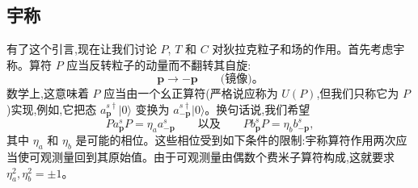 \subsection{宇称}

有了这个引言,现在让我们讨论 $P$, $T$ 和 $C$ 对狄拉克粒子和场的作用。首先考虑宇称。算符 $P$ 应当反转粒子的动量而不翻转其自旋:
\begin{equation}
  \mathbf{p} \to -\mathbf{p}\qquad \text{(镜像)。}
\end{equation}
数学上,这意味着 $P$ 应当由一个幺正算符(严格说应称为 $U(P)$,但我们只称它为 $P$)实现,例如,它把态 $a_{\mathbf{p}}^{s\dagger}|0\rangle$ 变换为 $a_{-\mathbf{p}}^{s\dagger}|0\rangle$。换句话说,我们希望
\begin{equation}
  P a_{\mathbf{p}}^s P = \eta_a a_{-\mathbf{p}}^s
  \qquad\text{以及}\qquad
  P b_{\mathbf{p}}^s P = \eta_b b_{-\mathbf{p}}^s,
  \label{eq:3.124}
\end{equation}
其中 $\eta_a$ 和 $\eta_b$ 是可能的相位。这些相位受到如下条件的限制:宇称算符作用两次应当使可观测量回到其原始值。由于可观测量由偶数个费米子算符构成,这就要求 $\eta_a^2, \eta_b^2 = \pm 1$。

